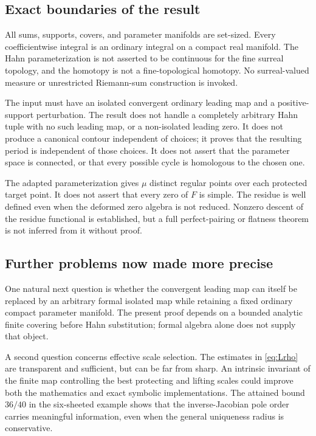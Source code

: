 \documentclass[11pt,letterpaper]{article}
\theoremstyle{definition}
\theoremstyle{remark}
\numberwithin{equation}{section}
\begin{document}
\subsection{Exact boundaries of the result}
All sums, supports, covers, and parameter manifolds are set-sized. Every
coefficientwise integral is an ordinary integral on a compact real manifold.
The Hahn parameterization is not asserted to be continuous for the fine
surreal topology, and the homotopy is not a fine-topological homotopy. No
surreal-valued measure or unrestricted Riemann-sum construction is invoked.

The input must have an isolated convergent ordinary leading map and a
positive-support perturbation. The result does not handle a completely
arbitrary Hahn tuple with no such leading map, or a non-isolated leading zero.
It does not produce a canonical contour independent of choices; it proves
that the resulting period is independent of those choices. It does not
assert that the parameter space is connected, or that every possible cycle
is homologous to the chosen one.

The adapted parameterization gives $\mu$ distinct regular points over each
protected target point. It does not assert that every zero of $F$ is simple.
The residue is well defined even when the deformed zero algebra is not
reduced. Nonzero descent of the residue functional is established, but a full
perfect-pairing or flatness theorem is not inferred from it without proof.

\subsection{Further problems now made more precise}
One natural next question is whether the convergent leading map can itself be
replaced by an arbitrary formal isolated map while retaining a fixed ordinary
compact parameter manifold. The present proof depends on a bounded analytic
finite covering before Hahn substitution; formal algebra alone does not
supply that object.

A second question concerns effective scale selection. The estimates in
\eqref{eq:Lrho} are transparent and sufficient, but can be far from sharp.
An intrinsic invariant of the finite map controlling the best protecting and
lifting scales could improve both the mathematics and exact symbolic
implementations. The attained bound $36/40$ in the six-sheeted example shows
that the inverse-Jacobian pole order carries meaningful information, even
when the general uniqueness radius is conservative.
\end{document}
